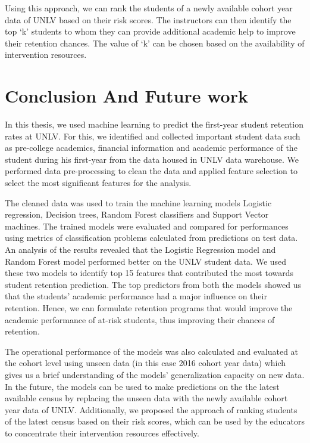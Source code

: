 \documentclass[11pt,openright]{report}
\begin{document}
Using this approach, we can rank the students of a newly available cohort year data of UNLV based on their risk scores. The instructors can then identify the top `k' students to whom they can provide additional academic help to improve their retention chances. The value of `k' can be chosen based on the availability of intervention resources.


\chapter{Conclusion And Future work} \label{chapter:conclusion}

In this thesis, we used machine learning to predict the first-year student retention rates at UNLV. For this, we identified and collected important student data such as pre-college academics, financial information and academic performance of the student during his first-year from the data housed in UNLV data warehouse. We performed data pre-processing to clean the data and applied feature selection to select the most significant features for the analysis. 

The cleaned data was used to train the machine learning models Logistic regression, Decision trees, Random Forest classifiers and Support Vector machines. The trained models were evaluated and compared for performances using metrics of classification problems calculated from predictions on test data. An analysis of the results revealed that the Logistic Regression model and Random Forest model performed better on the UNLV student data. We used these two models to identify top 15 features that contributed the most towards student retention prediction. The top predictors from both the models showed us that the students' academic performance had a major influence on their retention. Hence, we can formulate retention programs that would improve the academic performance of at-risk students, thus improving their chances of retention. 

The operational performance of the models was also calculated and evaluated at the cohort level using unseen data (in this case 2016 cohort year data) which gives us a brief understanding of the models' generalization capacity on new data. In the future, the models can be used to make predictions on the the latest available census by replacing the unseen data with the newly available cohort year data of UNLV. Additionally, we proposed the approach of ranking students of the latest census based on their risk scores, which can be used by the educators to concentrate their intervention resources effectively.
\end{document}
